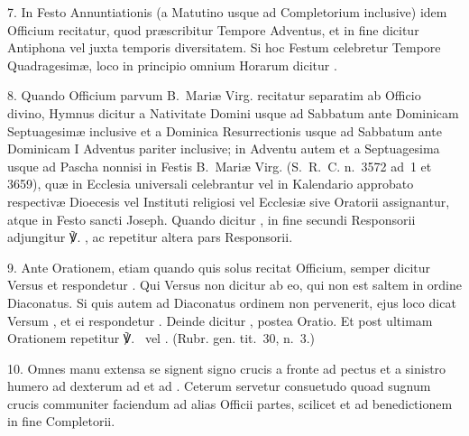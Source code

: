 \begin{multicols}{2}
7. In Festo Annuntiationis (a Matutino usque ad Completorium inclusive)
idem Officium recitatur, quod præscribitur Tempore Adventus, et in fine
dicitur Antiphona  vel 
juxta temporis diversitatem. Si hoc Festum celebretur Tempore Quadragesimæ,
loco  in principio omnium Horarum dicitur
.

8. Quando Officium parvum B.~Mariæ Virg. recitatur separatim ab Officio divino,
Hymnus  dicitur 
a Nativitate Domini usque ad Sabbatum ante Dominicam Septuagesimæ inclusive
et a Dominica Resurrectionis usque ad Sabbatum ante Dominicam I Adventus
pariter inclusive;
in Adventu autem et a Septuagesima usque ad Pascha nonnisi in Festis B.~Mariæ
Virg. (S.~R.~C. n.~3572 ad~1 et 3659), quæ in Ecclesia universali
celebrantur vel in Kalendario approbato respectivæ Dioecesis vel Instituti
religiosi vel Ecclesiæ sive Oratorii assignantur,
atque in Festo sancti Joseph.
Quando dicitur , in fine secundi Responsorii adjungitur
℣. , ac repetitur
altera pars Responsorii.

9. Ante Orationem, etiam quando quis solus recitat Officium,
semper dicitur Versus  et respondetur
. Qui Versus non dicitur ab eo, qui non est saltem
in ordine Diaconatus. Si quis autem ad Diaconatus ordinem non pervenerit,
ejus loco dicat Versum ,
et ei respondetur .
Deinde dicitur , postea Oratio.
Et post ultimam Orationem repetitur ℣.~
vel . (Rubr. gen. tit.~30, n.~3.)

10. Omnes manu extensa se signent signo crucis a fronte ad pectus et a sinistro
humero ad dexterum
ad  et ad . Ceterum servetur
consuetudo quoad sugnum crucis communiter faciendum ad alias Officii partes,
scilicet  et ad benedictionem in fine Completorii.

\end{multicols}
